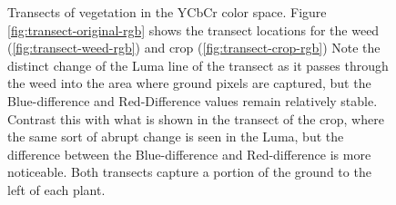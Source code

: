 \documentclass[letterpaper, notitlepage]{report}
\begin{document}
\begin{figure}[h]
	\centering
	\hfill
	\hfill
	\caption[YCbCr Transects]{Transects of vegetation in the YCbCr color space. Figure \ref{fig:transect-original-rgb} shows the transect locations for the weed (\ref{fig:transect-weed-rgb}) and crop (\ref{fig:transect-crop-rgb}) Note the distinct change of the Luma line of the transect as it passes through the weed into the area where ground pixels are captured, but the Blue-difference and Red-Difference values remain relatively stable. Contrast this with what is shown in the transect of the crop, where the same sort of abrupt change is seen in the Luma, but the difference between the Blue-difference and Red-difference is more noticeable. Both transects capture a portion of the ground to the left of each plant.}
	\label{fig:transects-ycbcr}
\end{figure}
\end{document}
